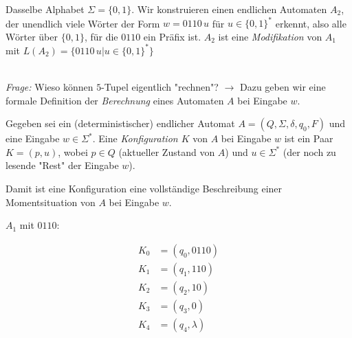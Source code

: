 \documentclass[runningheads,deutsch]{llncs}
\begin{document}
\begin{example}
    Dasselbe Alphabet $\Sigma = \{0,1\}$. Wir konstruieren einen endlichen Automaten $A_2$, der unendlich viele Wörter der Form $w = 0110\, u$ für $u \in \{0,1\}^*$ erkennt, also alle Wörter über $\{0,1\}$, für die $0110$ ein Präfix ist. $A_2$ ist eine \textit{Modifikation} von $A_1$ mit $L(A_2) = \{0110\,u | u\in \{0,1\}^*\}$\\
    \\

\end{example}

\textit{Frage:} Wieso können $5$-Tupel eigentlich "rechnen"? $\rightarrow$ Dazu geben wir eine formale Definition der \textit{Berechnung} eines Automaten $A$ bei Eingabe $w$.

\begin{definition}
    Gegeben sei ein (deterministischer) endlicher Automat $A = (Q, \Sigma, \delta, q_0, F)$ und eine Eingabe $w\in \Sigma^*$. Eine \textit{Konfiguration $K$} von $A$ bei Eingabe $w$ ist ein Paar $K=(p, u)$, wobei $p \in Q$ (aktueller Zustand von $A$) und $u \in \Sigma^*$ (der noch zu lesende "Rest" der Eingabe $w$).

    Damit ist eine Konfiguration eine vollständige Beschreibung einer Momentsituation von $A$ bei Eingabe $w$.
\end{definition}

\begin{example}
    $A_1$ mit $0110$:

    \begin{align*}
        K_0 &= (q_0, 0110) \\
        K_1 &= (q_1, 110) \\
        K_2 &= (q_2, 10) \\
        K_3 &= (q_3, 0) \\
        K_4 &= (q_4, \lambda)
    \end{align*}
\end{example}
\end{document}

